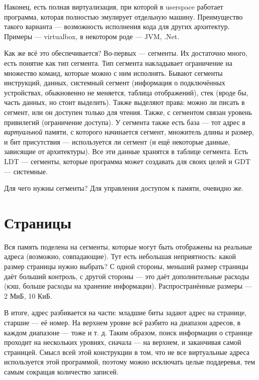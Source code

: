 \documentclass[main]{subfiles}
\begin{document}
Наконец, есть полная виртуализация, при которой в userspace работает программа,
которая полностью эмулирует отдельную машину. Преимущество такого варианта ---
возможность исполнения кода для других архитектур. Примеры --- virtualbox,
в некотором роде --- JVM, .Net.

Как же всё это обеспечивается?
Во-первых --- сегменты. Их достаточно много, есть понятие как тип сегмента.
Тип сегмента накладывает ограничение на множество команд, которые можно
с ним исполнять. Бывают сегменты инструкций, данных, системный сегмент
(информация о подключённых устройствах, обыкновенно не меняется, таблица
отображений), стек (вроде бы, часть данных, но стоит выделить).
Также выделяют права: можно ли писать в сегмент, или он доступен только
для чтения. Также, с сегментом связан уровень привилегий (ограничение доступа).
У сегмента также есть база --- тот адрес в \emph{виртуальной} памяти, с
которого начинается сегмент, множитель длины и размер, и бит
присутствия --- используется ли сегмент (и ещё некоторые данные, зависящие от
архитектуры). Все эти данные хранятся в таблице сегмента.
Есть LDT --- сегменты, которые программа может создавать для своих целей
и GDT --- системные.

Для чего нужны сегменты? Для управления доступом к памяти, очевидно же.

\section{Страницы}
Вся память поделена на сегменты, которые могут быть отображены
на реальные адреса (возможно, совпадающие). Тут есть небольшая неприятность:
какой размер страницы нужно выбрать? С одной стороны, меньший размер страницы
даёт больший контроль, с другой стороны --- это даёт дополнительные расходы
(кэш, больше расходы на хранение информации). Распространённые размеры ---
2 МиБ, 10 КиБ.

В итоге, адрес разбивается на части: младшие биты задают адрес на странице,
старшие --- её номер. На верхнем уровне всё разбито на диапазон адресов,
в каждом диапазоне --- тоже и т. д. Таким образом, поиск информации о
странице проходит на нескольких уровнях, сначала --- на верхнем, и
заканчивая самой страницей. Смысл всей этой конструкции в том,
что не все виртуальные адреса используется этой программой, поэтому
можно исключать целые поддеревья, тем самым сокращая количество записей.
\end{document}
